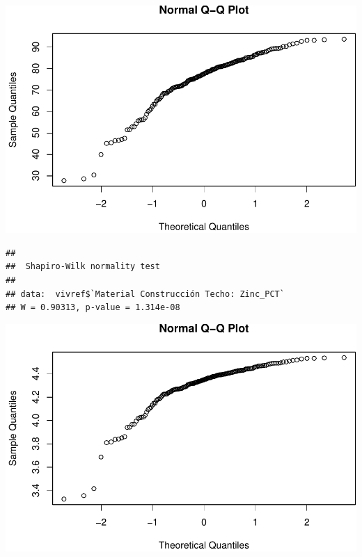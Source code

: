 \documentclass[11pt,]{article}
\newenvironment{Shaded}{\begin{snugshade}}{\end{snugshade}}
\newcommand{\KeywordTok}[1]{\textcolor[rgb]{0.13,0.29,0.53}{\textbf{#1}}}
\newcommand{\DataTypeTok}[1]{\textcolor[rgb]{0.13,0.29,0.53}{#1}}
\newcommand{\StringTok}[1]{\textcolor[rgb]{0.31,0.60,0.02}{#1}}
\newcommand{\OperatorTok}[1]{\textcolor[rgb]{0.81,0.36,0.00}{\textbf{#1}}}
\newcommand{\NormalTok}[1]{#1}
\begin{document}
\includegraphics{proyecto_files/figure-latex/unnamed-chunk-2-8.pdf}

\begin{Shaded}
\end{Shaded}

\begin{verbatim}
## 
##  Shapiro-Wilk normality test
## 
## data:  vivref$`Material Construcción Techo: Zinc_PCT`
## W = 0.90313, p-value = 1.314e-08
\end{verbatim}

\begin{Shaded}
\end{Shaded}

\includegraphics{proyecto_files/figure-latex/unnamed-chunk-2-9.pdf}
\end{document}
